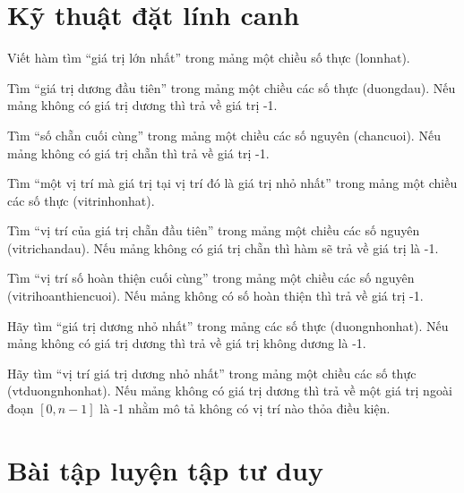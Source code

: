 \section{Kỹ thuật đặt lính canh}
\begin{problem}
    Viết hàm tìm “giá trị lớn nhất” trong mảng một chiều số thực (lonnhat).
\end{problem}
\begin{problem}
    Tìm “giá trị dương đầu tiên” trong mảng một chiều các số thực (duongdau). Nếu mảng không có giá trị dương thì trả về giá trị -1.
\end{problem}
\begin{problem}
    Tìm “số chẵn cuối cùng” trong mảng một chiều các số nguyên (chancuoi). Nếu mảng không có giá trị chẵn thì trả về giá trị -1.
\end{problem}
\begin{problem}
    Tìm “một vị trí mà giá trị tại vị trí đó là giá trị nhỏ nhất” trong mảng một chiều các số thực (vitrinhonhat).
\end{problem}
\begin{problem}
    Tìm “vị trí của giá trị chẵn đầu tiên” trong mảng một chiều các số nguyên (vitrichandau). Nếu mảng không có giá trị chẵn thì hàm sẽ trả về giá trị là -1.
\end{problem}
\begin{problem}
    Tìm “vị trí số hoàn thiện cuối cùng” trong mảng một chiều các số nguyên (vitrihoanthiencuoi). Nếu mảng không có số hoàn thiện thì trả về giá trị -1.
\end{problem}
\begin{problem}
    Hãy tìm “giá trị dương nhỏ nhất” trong mảng các số thực  (duongnhonhat). Nếu mảng không có giá trị dương thì trả về giá trị không dương là -1.
\end{problem}
\begin{problem}
    Hãy tìm “vị trí giá trị dương nhỏ nhất” trong mảng một chiều các số thực (vtduongnhonhat). Nếu mảng không có giá trị dương thì trả về một giá trị ngoài đoạn $[0,n-1]$ là -1 nhằm mô tả không có vị trí nào thỏa điều kiện.
\end{problem}


\section{Bài tập luyện tập tư duy}

